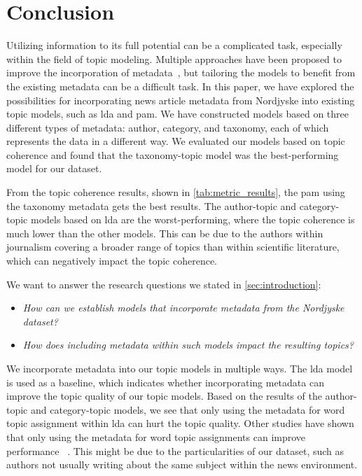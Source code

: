 \section{Conclusion}\label{sec:conclusion}
Utilizing information to its full potential can be a complicated task, especially within the field of topic modeling. 
Multiple approaches have been proposed to improve the incorporation of metadata~\cite{MetaLDA2017}\cite{author_topic_2012}, but tailoring the models to benefit from the existing metadata can be a difficult task.
In this paper, we have explored the possibilities for incorporating news article metadata from Nordjyske into existing topic models, such as \gls{lda} and \gls{pam}.
We have constructed models based on three different types of metadata: author, category, and taxonomy, each of which represents the data in a different way.
We evaluated our models based on topic coherence and found that the taxonomy-topic model was the best-performing model for our dataset.

From the topic coherence results, shown in \autoref{tab:metric_results}, the \acrfull{pam} using the taxonomy metadata gets the best results.
The author-topic and category-topic models based on \gls{lda} are the worst-performing, where the topic coherence is much lower than the other models. 
This can be due to the authors within journalism covering a broader range of topics than within scientific literature, which can negatively impact the topic coherence.

We want to answer the research questions we stated in \autoref{sec:introduction}:
\begin{itemize}	
    \item \textit{How can we establish models that incorporate metadata from the Nordjyske dataset?}
    \item \textit{How does including metadata within such models impact the resulting topics?}
 \end{itemize}

We incorporate metadata into our topic models in multiple ways.
The \gls{lda} model is used as a baseline, which indicates whether incorporating metadata can improve the topic quality of our topic models.
Based on the results of the author-topic and category-topic models, we see that only using the metadata for word topic assignment within \gls{lda} can hurt the topic quality.
Other studies have shown that only using the metadata for word topic assignments can improve performance~\cite{MetaLDA2017} \cite{author_topic_2012}.
This might be due to the particularities of our dataset, such as authors not usually writing about the same subject within the news environment.

